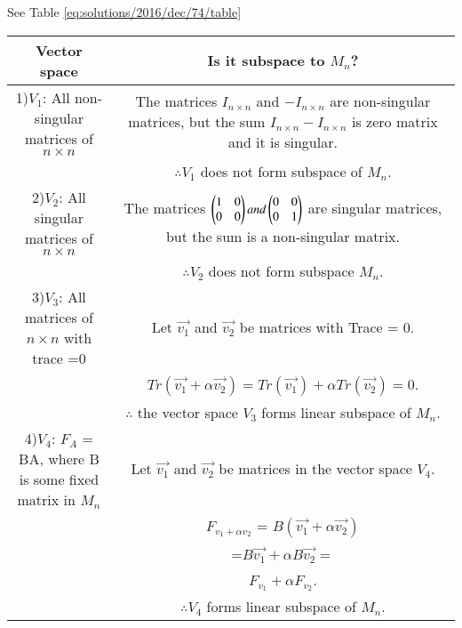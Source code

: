 See Table \ref{eq:solutions/2016/dec/74/table}

\begin{table*}[ht!]
\begin{center}
\resizebox{2\columnwidth}{!}
{
\begin{tabular}{ | c | c| } \hline 
Vector space & Is it subspace to $M_n$?\\  \hline
1)$V_1$: All non-singular matrices of $n \times n$ &   The matrices $I_{n\times n}$ and $-I_{n\times n}$ are non-singular matrices, but the sum $I_{n\times n}-I_{n\times n}$ is zero matrix and it is singular. \\& $\therefore V_1$ does not form subspace of $ M_n$.\\
\hline
2)$V_2$: All singular matrices of $n \times n$ &    The matrices $\begin{pmatrix}1&0\\0&0\end{pmatrix} and \begin{pmatrix}0 &0\\0&1\end{pmatrix}$  are singular matrices, but the sum is a non-singular matrix. \\& $\therefore V_2$ does not form subspace  $ M_n$.\\
\hline
3)$V_3$: All matrices of $n \times n$ with trace =0&    Let $ \vec{v_1}$ and $ \vec{v_2}$ be matrices with Trace = 0. \\& $Tr(\vec{v_1} + \alpha\vec{v_2}) = Tr(\vec{v_1}) + \alpha Tr(\vec{v_2}) = 0$. \\& $\therefore$ the vector space $V_3$  forms linear subspace of  $ M_n$.\\\hline
4)$V_4$: $F_A$ = BA, where B  is some fixed matrix in $ M_n$&     Let $ \vec{v_1}$ and $ \vec{v_2}$ be matrices in the vector space $V_4$.\\& $F_{v_1 +\alpha v_2}$ = $B(\vec{v_1} + \alpha\vec{v_2})$\\& =$ B\vec{v_1} + \alpha B\vec{v_2}  =$\\& $ F_{v_1} + \alpha F_{v_2} $.\\& $\therefore V_4$   forms linear subspace of $ M_n$.\\
\hline
\end{tabular}
}
\end{center}
\caption{}
\label{eq:solutions/2016/dec/74/table}
\end{table*}
